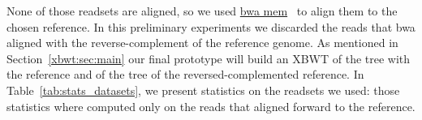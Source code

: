 None of those readsets are aligned, so we used \href{https://github.com/lh3/bwa}{{bwa mem}}~\cite{bwa} to align them to the chosen reference. In this preliminary experiments we discarded the reads that bwa aligned with the reverse-complement of the reference genome. As mentioned in Section~\ref{xbwt:sec:main} our final prototype will build an XBWT of the tree with the reference and of the tree of the reversed-complemented reference. In Table~\ref{tab:stats_datasets}, we present statistics on the readsets we used: those statistics where computed only on the reads that aligned forward to the reference.


\begin{table}[t]
\end{table}
